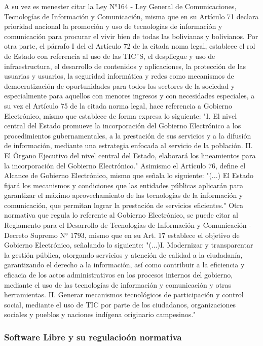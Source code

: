 A su vez es menester citar la Ley N°164 - Ley General de Comunicaciones, Tecnologías de Información y Comunicación, misma que en su Artículo 71 declara prioridad nacional la promoción y uso de tecnologías de información y comunicación para procurar el vivir bien de todas las bolivianas y bolivianos. Por otra parte, el párrafo I del el Artículo 72 de la citada noma legal, establece el rol de Estado con referencia al uso de las TIC´S, el despliegue y uso de infraestructura, el desarrollo de contenidos y aplicaciones, la protección de las usuarias y usuarios, la seguridad informática y redes como mecanismos de democratización de oportunidades para todos los sectores de la sociedad y especialmente para aquellos con menores ingresos y con necesidades especiales, a su vez el Artículo 75 de la citada norma legal, hace referencia a Gobierno Electrónico, mismo que establece de forma expresa lo siguiente: "I. El nivel central del Estado promueve la incorporación del Gobierno Electrónico a los procedimientos gubernamentales, a la prestación de sus servicios y a la difusión de información, mediante una estrategia enfocada al servicio de la población. II. El Órgano Ejecutivo del nivel central del Estado, elaborará los lineamientos para la incorporación del Gobierno Electrónico." Asimismo el Artículo 76, define el Alcance de Gobierno Electrónico, mismo que señala lo siguiente: "(...) El Estado fijará los mecanismos y condiciones que las entidades públicas aplicarán para garantizar el máximo aprovechamiento de las tecnologías de la información y comunicación, que permitan lograr la prestación de servicios eficientes." 
 Otra normativa que regula lo referente al Gobierno Electrónico, se puede citar al Reglamento para el Desarrollo de Tecnologías de Información y Comunicación - Decreto Supremo N° 1793, mismo que en su Art. 17 establece el objetivo de Gobierno Electrónico, señalando lo siguiente: "(...)I. Modernizar y transparentar la gestión pública, otorgando servicios y atención de calidad a la ciudadanía, garantizando el derecho a la información, así como contribuir a la eficiencia y eficacia de los actos administrativos en los procesos internos del gobierno, mediante el uso de las tecnologías de información y comunicación y otras herramientas. II. Generar mecanismos tecnológicos de participación y control social, mediante el uso de TIC por parte de los ciudadanos, organizaciones sociales y pueblos y naciones indígena originario campesinos."
\subsubsection{Software Libre y su regulacioón normativa}
